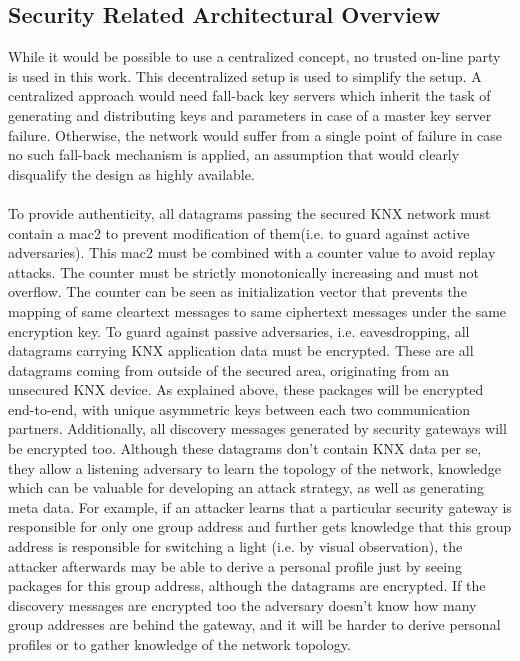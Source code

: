 \subsection{Security Related Architectural Overview}
While it would be possible to use a centralized concept, no trusted on-line party is used in this work. This decentralized setup is used
to simplify the setup. A centralized approach would need fall-back key servers
which inherit the task of generating and distributing keys and parameters in case of a master key server failure. Otherwise, the network would suffer from a
single point of failure in case no such fall-back mechanism is applied, an assumption that would clearly disqualify the design as highly available.	 
\\
\\
To provide authenticity, all datagrams passing the secured KNX network must contain a \gls{mac2} to prevent modification of them(i.e. to guard against active
adversaries). This \gls{mac2} must be combined with a counter value to avoid replay attacks. The counter must be strictly monotonically increasing and must not overflow.
The counter can be seen as initialization vector that prevents the mapping of same cleartext messages to same ciphertext messages under the same
encryption key.
To guard against passive adversaries, i.e. eavesdropping, all datagrams carrying KNX application data must be encrypted. These are all datagrams coming from outside of the
secured area, originating from an unsecured KNX device. As explained above, these packages will be encrypted end-to-end, with unique asymmetric keys between
each two communication partners.
Additionally, all discovery messages generated by security gateways will be encrypted too. Although these datagrams don't contain KNX data per se, they allow
a listening adversary to learn the topology of the network, knowledge which can be valuable for developing an attack strategy, as well as generating meta data.
For example, if an attacker learns that a particular security gateway is responsible for only one group address and further gets knowledge that this 
group address is responsible for switching a light (i.e. by visual observation), the attacker afterwards may be able to derive a personal profile just by seeing
packages for this group address, although the datagrams are encrypted. If the discovery messages are encrypted too the adversary doesn't know how many
group addresses are behind the gateway, and it will be harder to derive personal profiles or to gather knowledge of the network topology.

